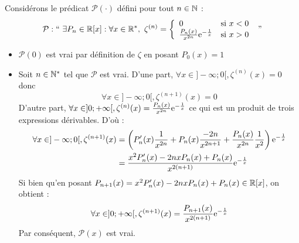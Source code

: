 \documentclass{article}
\renewenvironment{question_kholle}[2][ ]
{
	\subsection{\texorpdfstring{#2}{}}
	\notblank{#1}
	{
		\noindent #1
		\bigbreak
	}
	{}
	\begin{proof}
}
{
	\end{proof}
}
\begin{document}
\begin{question_kholle}
		Considérons le prédicat $\mathcal{P}(\cdot)$ défini pour tout $n \in \mathbb N$ :
		\begin{equation}
			\mathcal{P} : \text{\textquotedblleft} \ \exists P_n \in \R[x] : \forall x \in \R^*, \ \zeta^{(n)} = \left\{ \begin{array}{lc}
				0 &\text{si } x < 0 \\
				\frac{P_n(x)}{x^{2n}} \e^{-\frac{1}{x}} &\text{si } x > 0
			\end{array} \right. \ \text{\textquotedblright}
		\end{equation}
		\begin{itemize}[label=$\star$]
			\item $\mathcal{P}(0)$ est vrai par définition de $\zeta$ en posant $P_0(x) = 1$
			\item Soit $n \in \mathbb N^*$ \fq tel que $\mathcal{P}$ est vrai.
			D'une part, $\forall x \in ]-\infty;0[, \zeta^{(n)}(x) = 0$ donc
			\begin{equation*}
				\forall x \in ]-\infty;0[, \zeta^{(n+1)}(x) = 0
			\end{equation*}
			D'autre part, $\forall x \in ]0;+\infty[, \zeta^{(n)}(x) = \frac{P_n(x)}{x^{2n}} \mathrm{e}^{-\frac{1}{x}}$ ce qui est un produit de trois expressions dérivables. D'où :
			\begin{equation*}
				\begin{aligned}
					\forall x \in ]-\infty;0[,
					\zeta^{(n+1)}(x)
					&= \left( P_n'(x) \frac{1}{x^{2n}} + P_n(x) \frac{-2n}{x^{2n+1}} + \frac{P_n(x)}{x^{2n}} \frac{1}{x^2} \right) \mathrm{e}^{-\frac{1}{x}} \\
					&= \frac{x^2 P_n'(x) - 2nxP_n(x) + P_n(x)}{x^{2(n+1)}} \mathrm{e}^{-\frac{1}{x}}
				\end{aligned}
			\end{equation*}
			Si bien qu'en posant $P_{n+1}(x) = x^2 P_n'(x) - 2 n x P_n(x) + P_n(x) \in \mathbb R[x]$, on obtient :
			\begin{equation*}
				\forall x \in ]0;+\infty[, \zeta^{(n+1)}(x) = \frac{P_{n+1}(x)}{x^{2(n+1)}} \mathrm{e}^{-\frac{1}{x}}
			\end{equation*}
			Par conséquent, $\mathcal{P}(x)$ est vrai.


\end{itemize}
\end{question_kholle}
\end{document}
